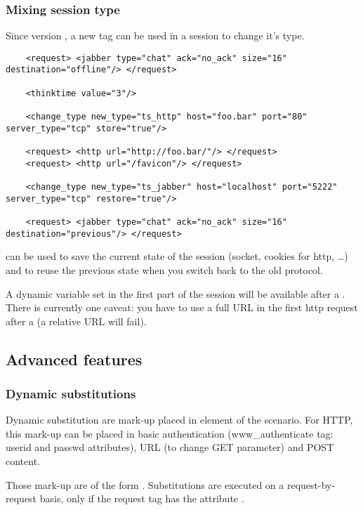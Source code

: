\documentclass{TSUNG-en}
\begin{document}
\subsubsection{Mixing session type}

Since version , a new tag  can be
used in a session to change it's type.


\begin{Verbatim}
    <request> <jabber type="chat" ack="no_ack" size="16"
destination="offline"/> </request>

    <thinktime value="3"/>

    <change_type new_type="ts_http" host="foo.bar" port="80"
server_type="tcp" store="true"/>

    <request> <http url="http://foo.bar/"/> </request>
    <request> <http url="/favicon"/> </request>

    <change_type new_type="ts_jabber" host="localhost" port="5222"
server_type="tcp" restore="true"/>

    <request> <jabber type="chat" ack="no_ack" size="16"
destination="previous"/> </request>
\end{Verbatim}

 can be used to save the current state of the session (socket,
cookies for http, \ldots{}) and  to reuse the previous state when
you switch back to the old protocol.

A dynamic variable set in the first part of the session will be
available after a . There is currently one caveat: you have
to use a full URL in the first http request after a  (a
relative URL will fail).



\subsection{Advanced features}

\subsubsection{Dynamic substitutions}

 Dynamic substitution are mark-up placed in element of the scenario.
For HTTP, this mark-up can be placed in basic authentication (www\_authenticate
tag: userid and passwd attributes), URL (to change GET parameter)
and POST content.

Those mark-up are of the form .
Substitutions are executed on a request-by-request basis, only if the
request tag has the attribute .
\end{document}

